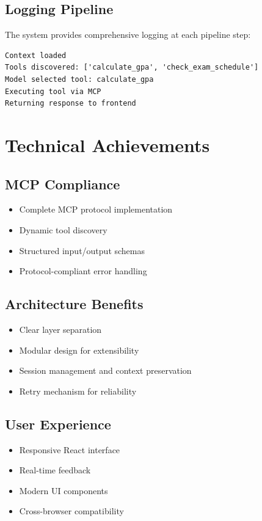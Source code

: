 \documentclass[12pt, a4paper]{report}
\begin{document}
\section{Logging Pipeline}
The system provides comprehensive logging at each pipeline step:
\begin{verbatim}
Context loaded
Tools discovered: ['calculate_gpa', 'check_exam_schedule']
Model selected tool: calculate_gpa
Executing tool via MCP
Returning response to frontend
\end{verbatim}

\chapter{Technical Achievements}

\section{MCP Compliance}
\begin{itemize}
    \item Complete MCP protocol implementation
    \item Dynamic tool discovery
    \item Structured input/output schemas
    \item Protocol-compliant error handling
\end{itemize}

\section{Architecture Benefits}
\begin{itemize}
    \item Clear layer separation
    \item Modular design for extensibility
    \item Session management and context preservation
    \item Retry mechanism for reliability
\end{itemize}

\section{User Experience}
\begin{itemize}
    \item Responsive React interface
    \item Real-time feedback
    \item Modern UI components
    \item Cross-browser compatibility
\end{itemize}
\end{document}
